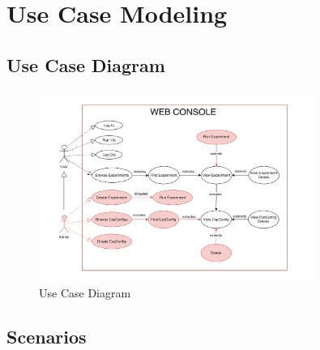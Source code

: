 \section{Use Case Modeling}\label{sec:use-case-modeling}

\subsection{Use Case Diagram}\label{subsec:use-case-diagram}

\begin{figure}[ht!]
    \centering
    \includegraphics[width=0.8\textwidth]{images/2_analisys/FL_class_diag.drawio}
    \caption{Use Case Diagram}
    \label{fig:figure}
\end{figure}

\subsection{Scenarios}\label{subsec:scenarios}

